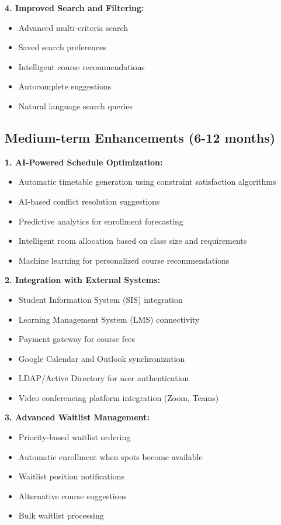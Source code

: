 \textbf{4. Improved Search and Filtering:}
\begin{itemize}
    \item Advanced multi-criteria search
    \item Saved search preferences
    \item Intelligent course recommendations
    \item Autocomplete suggestions
    \item Natural language search queries
\end{itemize}

\subsection{Medium-term Enhancements (6-12 months)}

\textbf{1. AI-Powered Schedule Optimization:}
\begin{itemize}
    \item Automatic timetable generation using constraint satisfaction algorithms
    \item AI-based conflict resolution suggestions
    \item Predictive analytics for enrollment forecasting
    \item Intelligent room allocation based on class size and requirements
    \item Machine learning for personalized course recommendations
\end{itemize}

\textbf{2. Integration with External Systems:}
\begin{itemize}
    \item Student Information System (SIS) integration
    \item Learning Management System (LMS) connectivity
    \item Payment gateway for course fees
    \item Google Calendar and Outlook synchronization
    \item LDAP/Active Directory for user authentication
    \item Video conferencing platform integration (Zoom, Teams)
\end{itemize}

\textbf{3. Advanced Waitlist Management:}
\begin{itemize}
    \item Priority-based waitlist ordering
    \item Automatic enrollment when spots become available
    \item Waitlist position notifications
    \item Alternative course suggestions
    \item Bulk waitlist processing
\end{itemize}

